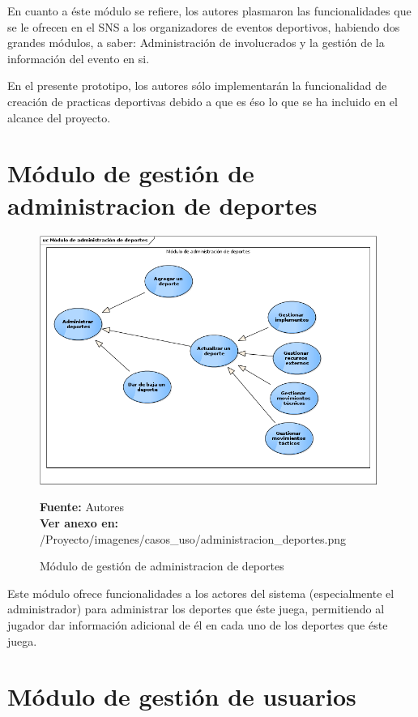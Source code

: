 En cuanto a éste módulo se refiere, los autores plasmaron las funcionalidades que se le ofrecen en el SNS a los organizadores de eventos deportivos, habiendo dos grandes módulos, a saber: Administración de involucrados y la gestión de la información del evento en si.

En el presente prototipo, los autores sólo implementarán la funcionalidad de creación de practicas deportivas debido a que es éso lo que se ha incluido en el alcance del proyecto.

\section{Módulo de gestión de administracion de deportes}

\begin{figure}[!htb]
  \begin{center}
    \includegraphics[width=11cm]{./imagenes/casos_uso/administracion_deportes.png}
    \caption{Módulo de gestión de administracion de deportes}
    \label{fig:cu_admin_dep}
    \textbf{Fuente:} Autores \\
    \textbf{Ver anexo en:} /Proyecto/imagenes/casos\_uso/administracion\_deportes.png
  \end{center}
\end{figure}

Este módulo ofrece funcionalidades a los actores del sistema (especialmente el administrador) para administrar los deportes que éste juega, permitiendo al jugador dar información adicional de él en cada uno de los deportes que éste juega.

\section{Módulo de gestión de usuarios}

